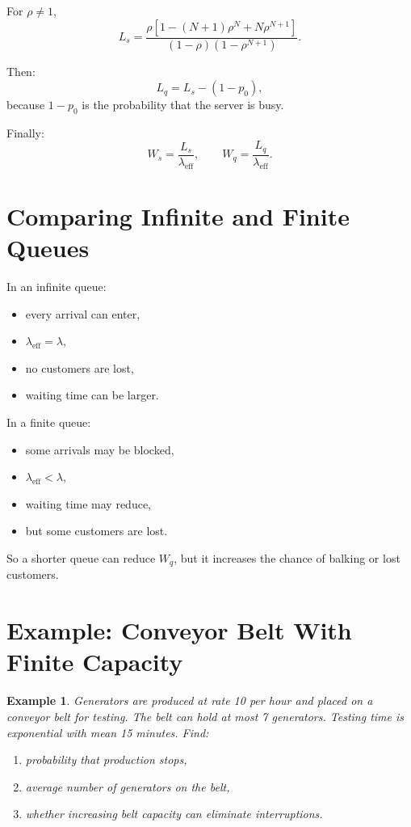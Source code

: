 \documentclass[12pt]{article}
\newtheorem{example}{Example}
\begin{document}
For \(\rho\neq 1\),
\[
\boxed{
L_s=
\frac{\rho\left[1-(N+1)\rho^N+N\rho^{N+1}\right]}
{(1-\rho)(1-\rho^{N+1})}.
}
\]

Then:
\[
L_q=L_s-(1-p_0),
\]
because \(1-p_0\) is the probability that the server is busy.

Finally:
\[
W_s=\frac{L_s}{\lambda_{\text{eff}}},
\qquad
W_q=\frac{L_q}{\lambda_{\text{eff}}}.
\]

\section{Comparing Infinite and Finite Queues}

In an infinite queue:

\begin{itemize}
    \item every arrival can enter,
    \item \(\lambda_{\text{eff}}=\lambda\),
    \item no customers are lost,
    \item waiting time can be larger.
\end{itemize}

In a finite queue:

\begin{itemize}
    \item some arrivals may be blocked,
    \item \(\lambda_{\text{eff}}<\lambda\),
    \item waiting time may reduce,
    \item but some customers are lost.
\end{itemize}

So a shorter queue can reduce \(W_q\), but it increases the chance of balking or lost customers.

\section{Example: Conveyor Belt With Finite Capacity}

\begin{example}
Generators are produced at rate 10 per hour and placed on a conveyor belt for testing. The belt can hold at most 7 generators. Testing time is exponential with mean 15 minutes. Find:

\begin{enumerate}[label=(\alph*)]
    \item probability that production stops,
    \item average number of generators on the belt,
    \item whether increasing belt capacity can eliminate interruptions.
\end{enumerate}
\end{example}
\end{document}
